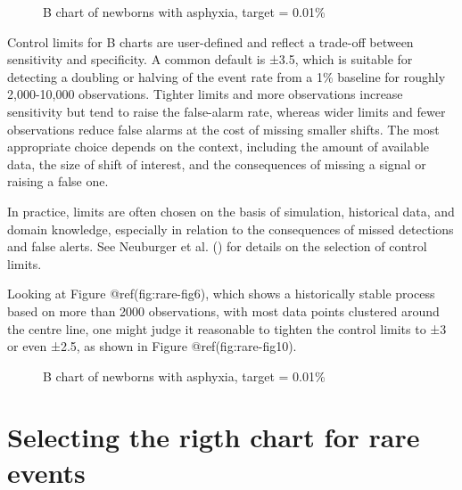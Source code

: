 \documentclass[
]{book}
\makeatletter
\newenvironment{Shaded}{\begin{snugshade}}{\end{snugshade}}
\newcommand{\AttributeTok}[1]{\textcolor[rgb]{0.13,0.29,0.53}{#1}}
\newcommand{\FloatTok}[1]{\textcolor[rgb]{0.00,0.00,0.81}{#1}}
\newcommand{\FunctionTok}[1]{\textcolor[rgb]{0.13,0.29,0.53}{\textbf{#1}}}
\newcommand{\NormalTok}[1]{#1}
\newcommand{\SpecialCharTok}[1]{\textcolor[rgb]{0.81,0.36,0.00}{\textbf{#1}}}
\newcommand*\pandocbounded[1]{%
  \sbox\pandoc@box{#1}%
  \Gscale@div\@tempa{\textheight}{\dimexpr\ht\pandoc@box+\dp\pandoc@box\relax}%
  \Gscale@div\@tempb{\linewidth}{\wd\pandoc@box}%
  \ifdim\@tempb\p@<\@tempa\p@\let\@tempa\@tempb\fi%
  \ifdim\@tempa\p@<\p@\scalebox{\@tempa}{\usebox\pandoc@box}%
  \else\usebox{\pandoc@box}%
  \fi%
}
\makeatother
\begin{document}
\begin{figure}
\centering
\pandocbounded{}
\caption{B chart of newborns with asphyxia, target = 0.01\%}
\end{figure}

Control limits for B charts are user-defined and reflect a trade-off
between sensitivity and specificity. A common default is ±3.5, which is
suitable for detecting a doubling or halving of the event rate from a
1\% baseline for roughly 2,000-10,000 observations. Tighter limits and
more observations increase sensitivity but tend to raise the false-alarm
rate, whereas wider limits and fewer observations reduce false alarms at
the cost of missing smaller shifts. The most appropriate choice depends
on the context, including the amount of available data, the size of
shift of interest, and the consequences of missing a signal or raising a
false one.

In practice, limits are often chosen on the basis of simulation,
historical data, and domain knowledge, especially in relation to the
consequences of missed detections and false alerts. See Neuburger et al.
() for details on the selection of
control limits.

Looking at Figure @ref(fig:rare-fig6), which shows a historically stable
process based on more than 2000 observations, with most data points
clustered around the centre line, one might judge it reasonable to
tighten the control limits to ±3 or even ±2.5, as shown in Figure
@ref(fig:rare-fig10).

\begin{Shaded}
\end{Shaded}

\begin{figure}
\centering
\pandocbounded{}
\caption{B chart of newborns with asphyxia, target = 0.01\%}
\end{figure}

\section{Selecting the rigth chart for rare
events}\label{selecting-the-rigth-chart-for-rare-events}
\end{document}
